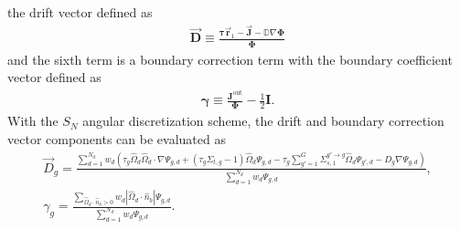 the drift vector defined as
%
\begin{gather}
  \vec{\bm{D}} \equiv \frac{\bm{\tau}\vec{\bm{r}}_1-\vec{\bm{J}}-\mathbb{D}\nabla\bm{\Phi}}{\bm{\Phi}}
\end{gather}
%
and the sixth term is a boundary correction term with the boundary coefficient vector defined as
%
\begin{gather}
  \bm{\gamma} \equiv \frac{\bm{J}^\text{out}}{\bm{\Phi}}-\frac{1}{2}\bm{I}.
\end{gather}
%
With the $S_N$ angular discretization scheme, the drift and boundary correction vector components
can be evaluated as
%
\begin{gather}
  \vec{D}_g = \frac{\sum^{N_d}_{d=1}w_d\left(\tau_g\hat{\Omega}_d\hat{\Omega}_d\cdot\nabla\Psi_{g,d}
  + \left(\tau_g\Sigma_{t,g}-1\right)\hat{\Omega}_d\Psi_{g,d}
  - \tau_g\sum^G_{g'=1}\Sigma^{g'\rightarrow g}_{s,1}\hat{\Omega}_d\Psi_{g',d}
  - D_g\nabla\Psi_{g,d}\right)}{\sum^{N_d}_{d=1}w_d\Psi_{g,d}}, \\
  \gamma_g =
  \frac{\sum_{\hat{\Omega}_d\cdot\hat{n}_b > 0}w_d |\hat{\Omega}_d\cdot\hat{n}_b |
  \Psi_{g,d}}{\sum^{N_d}_{d=1}w_d\Psi_{g,d}}.
\end{gather}

%
%

